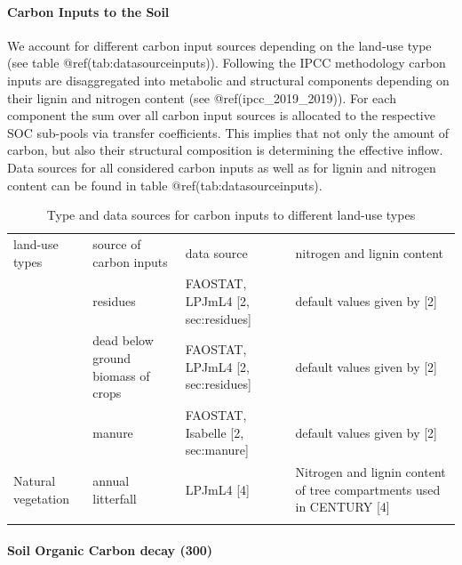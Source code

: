 \documentclass[gc, manuscript]{copernicus}
\begin{document}
\hypertarget{sec:carboninputs}{%
\paragraph{Carbon Inputs to the Soil}\label{sec:carboninputs}}

We account for different carbon input sources depending on the land-use
type (see table @ref(tab:datasourceinputs)). Following the IPCC
methodology carbon inputs are disaggregated into metabolic and
structural components depending on their lignin and nitrogen content
(see @ref(ipcc\_2019\_2019)). For each component the sum over all carbon
input sources is allocated to the respective SOC sub-pools via transfer
coefficients. This implies that not only the amount of carbon, but also
their structural composition is determining the effective inflow. Data
sources for all considered carbon inputs as well as for lignin and
nitrogen content can be found in table @ref(tab:datasourceinputs).

 \begin{table}[h]
 \caption{Type and data sources for carbon inputs to different land-use types}
 \begin{tabular}{l l l l}
 \tophline
  land-use types   & source of carbon inputs & data source & nitrogen and lignin content \\
 \middlehline
 \multirow{3}{*}{Cropland} & residues & FAOSTAT, LPJmL4 [2, sec:residues] & default values given by [2]  \\
                            & dead below ground biomass of crops & FAOSTAT, LPJmL4 [2, sec:residues] & default values given by [2] \\
                            & manure & FAOSTAT, Isabelle [2, sec:manure] & default values given by [2] \\
                            \hline
  Natural vegetation        & annual litterfall & LPJmL4 [4]& \begin{minipage}[t]{0.28\columnwidth}\raggedright\strut Nitrogen and lignin content of tree compartments used in CENTURY [4] \strut \end{minipage}\tabularnewline
 \bottomhline
 \end{tabular}
 \label{tab:datasourceinputs}
 \belowtable{}
 \end{table}

\hypertarget{sec:tier2}{%
\paragraph{Soil Organic Carbon decay (300)}\label{sec:tier2}}
\end{document}
